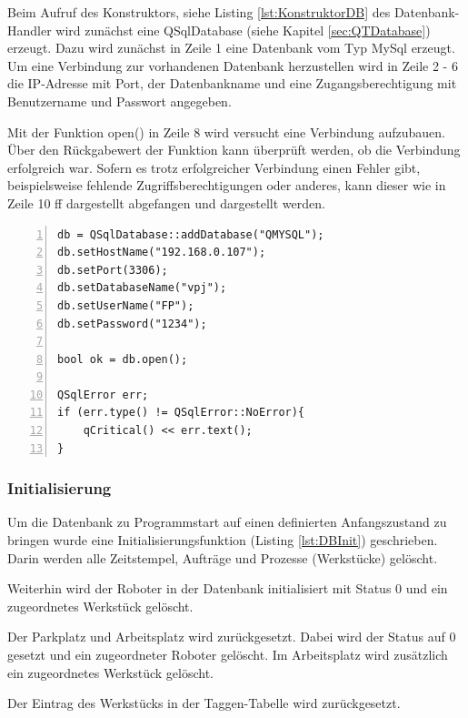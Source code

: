 Beim Aufruf des Konstruktors, siehe Listing \ref{lst:KonstruktorDB} des Datenbank-Handler wird zunächst eine QSqlDatabase (siehe Kapitel \ref{sec:QTDatabase}) erzeugt. Dazu wird zunächst in Zeile 1 eine Datenbank vom Typ MySql erzeugt. Um eine Verbindung zur vorhandenen Datenbank herzustellen wird in Zeile 2 - 6 die IP-Adresse mit Port, der Datenbankname und eine Zugangsberechtigung mit Benutzername und Passwort angegeben. 

Mit der Funktion open() in Zeile 8 wird versucht eine Verbindung aufzubauen. Über den Rückgabewert der Funktion kann überprüft werden, ob die Verbindung erfolgreich war. Sofern es trotz erfolgreicher Verbindung einen Fehler gibt, beispielsweise fehlende Zugriffsberechtigungen oder anderes, kann dieser wie in Zeile 10 ff dargestellt abgefangen und dargestellt werden. 

\begin{lstlisting}[frame=single, breaklines=true, numbers=left, stepnumber=2, firstnumber=1, numberstyle = \tiny, caption=Databank-Handler Konstruktor ,label=lst:KonstruktorDB]
db = QSqlDatabase::addDatabase("QMYSQL");
db.setHostName("192.168.0.107");
db.setPort(3306);
db.setDatabaseName("vpj");
db.setUserName("FP");
db.setPassword("1234");

bool ok = db.open();

QSqlError err;
if (err.type() != QSqlError::NoError){
    qCritical() << err.text();
}
\end{lstlisting}

\subsubsection{Initialisierung}

Um die Datenbank zu Programmstart auf einen definierten Anfangszustand zu bringen wurde eine Initialisierungsfunktion (Listing \ref{lst:DBInit}) geschrieben. Darin werden alle Zeitstempel, Aufträge und Prozesse (Werkstücke) gelöscht. 

Weiterhin wird der Roboter in der Datenbank initialisiert mit Status 0 und ein zugeordnetes Werkstück gelöscht. 

Der Parkplatz und Arbeitsplatz wird zurückgesetzt. Dabei wird der Status auf 0 gesetzt und ein zugeordneter Roboter gelöscht. Im Arbeitsplatz wird zusätzlich ein zugeordnetes Werkstück gelöscht.

Der Eintrag des Werkstücks in der Taggen-Tabelle wird zurückgesetzt.


